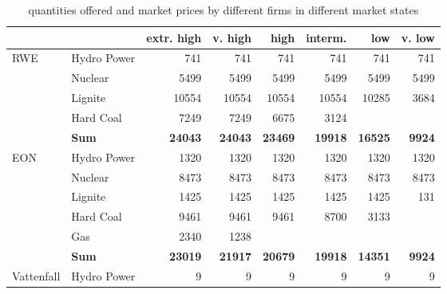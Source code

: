 
\begin{table}[htb]
\centering
\caption{quantities offered and market prices by different firms in different market states}
\begin{tabular}{llrrrrrr}
\hline
\hline
           &            & extr. high &    v. high &       high &    interm. &        low &     v. low \\
\hline
       RWE & Hydro Power &        741 &        741 &        741 &        741 &        741 &        741 \\

           &    Nuclear &       5499 &       5499 &       5499 &       5499 &       5499 &       5499 \\

           &    Lignite &      10554 &      10554 &      10554 &      10554 &      10285 &       3684 \\

           &  Hard Coal &       7249 &       7249 &       6675 &       3124 &            &            \\

           &  {\bf Sum} & {\bf 24043} & {\bf 24043} & {\bf 23469} & {\bf 19918} & {\bf 16525} & {\bf 9924} \\
\hline
       EON & Hydro Power &       1320 &       1320 &       1320 &       1320 &       1320 &       1320 \\

           &    Nuclear &       8473 &       8473 &       8473 &       8473 &       8473 &       8473 \\

           &    Lignite &       1425 &       1425 &       1425 &       1425 &       1425 &        131 \\

           &  Hard Coal &       9461 &       9461 &       9461 &       8700 &       3133 &            \\

           &        Gas &       2340 &       1238 &            &            &            &            \\

           &  {\bf Sum} & {\bf 23019} & {\bf 21917} & {\bf 20679} & {\bf 19918} & {\bf 14351} & {\bf 9924} \\
\hline
Vattenfall & Hydro Power &          9 &          9 &          9 &          9 &          9 &          9 \\


\end{tabular}
\end{table}
